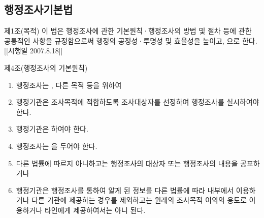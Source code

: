 \subsection{행정조사기본법}
제1조(목적)
이 법은 행정조사에 관한 기본원칙·행정조사의 방법 및 절차 등에 관한 공통적인 사항을 규정함으로써 행정의 공정성·투명성 및 효율성을 높이고, 으로 한다.
[[시행일 2007.8.18]]

제4조(행정조사의 기본원칙)
\begin{enumerate}[①]\tightlist
\item 행정조사는 , 다른 목적 등을 위하여 
\item 행정기관은 조사목적에 적합하도록 조사대상자를 선정하여 행정조사를 실시하여야 한다.
\item 행정기관은   하여야 한다.
\item 행정조사는  을 두어야 한다.
\item 다른 법률에 따르지 아니하고는 행정조사의 대상자 또는 행정조사의 내용을 공표하거나 
\item 행정기관은 행정조사를 통하여 알게 된 정보를 다른 법률에 따라 내부에서 이용하거나 다른 기관에 제공하는 경우를 제외하고는 원래의 조사목적 이외의 용도로 이용하거나 타인에게 제공하여서는 아니 된다.
\end{enumerate}

